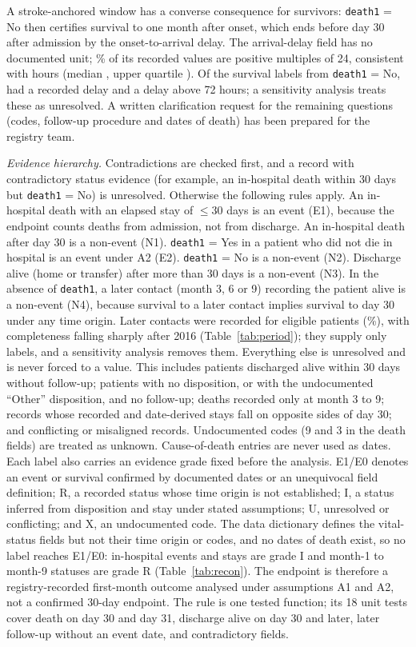 \documentclass[preprint,10pt]{elsarticle}
\begin{document}
A stroke-anchored window has a converse consequence for survivors: \texttt{death1} = No then certifies survival to one month after onset, which ends before day 30 after admission by the onset-to-arrival delay. The arrival-delay field has no documented unit; \DelayHeap\% of its recorded values are positive multiples of 24, consistent with hours (median \DelayMed, upper quartile \DelayQthree). Of the \NtwoAll{} survival labels from \texttt{death1} = No, \NtwoDelay{} had a recorded delay and \NtwoGap{} a delay above 72 hours; a sensitivity analysis treats these as unresolved. A written clarification request for the remaining questions (codes, follow-up procedure and dates of death) has been prepared for the registry team.

\emph{Evidence hierarchy.} Contradictions are checked first, and a record with contradictory status evidence (for example, an in-hospital death within 30 days but \texttt{death1} = No) is unresolved. Otherwise the following rules apply. An in-hospital death with an elapsed stay of $\le30$ days is an event (E1), because the endpoint counts deaths from admission, not from discharge. An in-hospital death after day 30 is a non-event (N1). \texttt{death1} = Yes in a patient who did not die in hospital is an event under A2 (E2). \texttt{death1} = No is a non-event (N2). Discharge alive (home or transfer) after more than 30 days is a non-event (N3). In the absence of \texttt{death1}, a later contact (month 3, 6 or 9) recording the patient alive is a non-event (N4), because survival to a later contact implies survival to day 30 under any time origin. Later contacts were recorded for \LaterRec{} eligible patients (\LaterPct\%), with completeness falling sharply after 2016 (Table~\ref{tab:period}); they supply only \NNfour{} labels, and a sensitivity analysis removes them. Everything else is unresolved and is never forced to a value. This includes patients discharged alive within 30 days without follow-up; patients with no disposition, or with the undocumented ``Other'' disposition, and no follow-up; deaths recorded only at month 3 to 9; records whose recorded and date-derived stays fall on opposite sides of day 30; and conflicting or misaligned records. Undocumented codes (9 and 3 in the death fields) are treated as unknown. Cause-of-death entries are never used as dates. Each label also carries an evidence grade fixed before the analysis. E1/E0 denotes an event or survival confirmed by documented dates or an unequivocal field definition; R, a recorded status whose time origin is not established; I, a status inferred from disposition and stay under stated assumptions; U, unresolved or conflicting; and X, an undocumented code. The data dictionary defines the vital-status fields but not their time origin or codes, and no dates of death exist, so no label reaches E1/E0: in-hospital events and stays are grade I and month-1 to month-9 statuses are grade R (Table~\ref{tab:recon}). The endpoint is therefore a registry-recorded first-month outcome analysed under assumptions A1 and A2, not a confirmed 30-day endpoint. The rule is one tested function; its 18 unit tests cover death on day 30 and day 31, discharge alive on day 30 and later, later follow-up without an event date, and contradictory fields.
\end{document}

